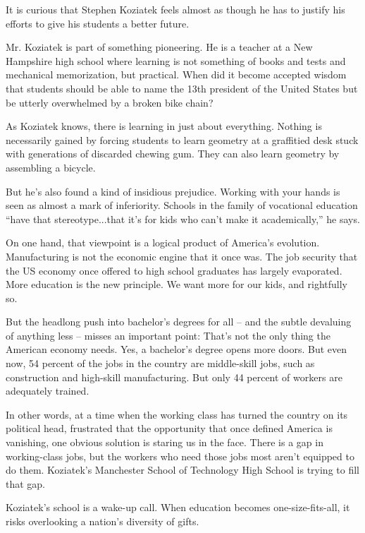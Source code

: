 It is curious that Stephen Koziatek feels almost as though he has to justify his efforts to give his students a better future.


Mr. Koziatek is part of something pioneering. He is a teacher at a New Hampshire high school where learning is not something of books and tests and mechanical memorization, but practical. When did it become accepted wisdom that students should be able to name the 13th president of the United States but be utterly overwhelmed by a broken bike chain?


As Koziatek knows, there is learning in just about everything. Nothing is necessarily gained by forcing students to learn geometry at a graffitied desk stuck with generations of discarded chewing gum. They can also learn geometry by assembling a bicycle.


But he's also found a kind of insidious prejudice. Working with your hands is seen as almost a mark of inferiority. Schools in the family of vocational education ``have that stereotype...that it's for kids who can't make it academically,'' he says.


On one hand, that viewpoint is a logical product of America's evolution. Manufacturing is not the economic engine that it once was. The job security that the US economy once offered to high school graduates has largely evaporated. More education is the new principle. We want more for our kids, and rightfully so.


But the headlong push into bachelor's degrees for all – and the subtle devaluing of anything less – misses an important point: That's not the only thing the American economy needs. Yes, a bachelor's degree opens more doors. But even now, 54 percent of the jobs in the country are middle-skill jobs, such as construction and high-skill manufacturing. But only 44 percent of workers are adequately trained.


In other words, at a time when the working class has turned the country on its political head, frustrated that the opportunity that once defined America is vanishing, one obvious solution is staring us in the face. There is a gap in working-class jobs, but the workers who need those jobs most aren't equipped to do them. Koziatek's Manchester School of Technology High School is trying to fill that gap.


Koziatek's school is a wake-up call. When education becomes one-size-fits-all, it risks overlooking a nation's diversity of gifts.